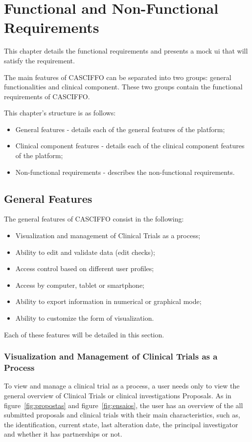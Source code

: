 % 
%
\chapter{Functional and Non-Functional Requirements}
\label{ch:functionalities}
This chapter details the functional requirements and presents a mock \acrfull{ui} that will satisfy the requirement.

The main features of CASCIFFO can be separated into two groups: general functionalities and clinical component.
These two groups contain the functional requirements of CASCIFFO.

This chapter's structure is as follows:

\begin{itemize}
    \item General features - details each of the general features of the platform;
    \item Clinical component features - details each of the clinical component features of the platform;
    \item Non-functional requirements - describes the non-functional requirements.
\end{itemize}

\section{General Features}
\label{sec:general-features}
The general features of CASCIFFO consist in the following:
\begin{itemize}
    \item Visualization and management of Clinical Trials as a process; 
    \item Ability to edit and validate data (edit checks);
    \item Access control based on different user profiles; 
    \item Access by computer, tablet or smartphone; 
    \item Ability to export information in numerical or graphical mode; 
    \item Ability to customize the form of visualization.
\end{itemize}
Each of these features will be detailed in this section.

\subsection{Visualization and Management of Clinical Trials as a Process}
\label{subsec:visualization-clinical-trials-as-process}
To view and manage a clinical trial as a process, a user needs only to view the general overview of Clinical Trials or clinical investigations Proposals.
As in figure~\ref{fig:propostas} and figure~\ref{fig:ensaios}, the user has an overview of the all submitted proposals and clinical trials with their main characteristics, such as, the identification, current state, last alteration date, the principal investigator and whether it has partnerships or not.

